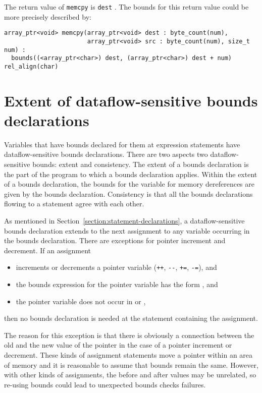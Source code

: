 The return value of \texttt{memcpy} is \texttt{dest} . The bounds for
this return value could be more precisely described by:

\begin{verbatim}
array_ptr<void> memcpy(array_ptr<void> dest : byte_count(num),
                       array_ptr<void> src : byte_count(num), size_t num) :
  bounds((<array_ptr<char>) dest, (array_ptr<char>) dest + num) rel_align(char)
\end{verbatim}

\section{Extent of dataflow-sensitive bounds declarations}
\label{section:extent-of-declarations}

Variables that have bounds declared for them at expression statements
have dataflow-sensitive bounds declarations. There are two aspects two
dataflow-sensitive bounds: extent and consistency. The extent of a
bounds declaration is the part of the program to which a bounds
declaration applies. Within the extent of a bounds declaration, the
bounds for the variable for memory dereferences are given by the bounds
declaration. Consistency is that all the bounds declarations flowing to
a statement agree with each other.

As mentioned in Section~\ref{section:statement-declarations},
a dataflow-sensitive bounds declaration
extends to the next assignment to any variable occurring in the bounds
declaration. There are exceptions for pointer increment and decrement.
If an assignment

\begin{itemize}
\item
  increments or decrements a pointer variable (\texttt{++},
  \texttt{-\/-}, \texttt{+=}, \texttt{-=}), and
\item
  the bounds expression for the pointer variable has the form
  , and
\item
  the pointer variable does not occur in  or ,
\end{itemize}

then no bounds declaration is needed at the statement containing the
assignment.

The reason for this exception is that there is obviously a connection
between the old and the new value of the pointer in the case of a
pointer increment or decrement. These kinds of assignment statements
move a pointer within an area of memory and it is reasonable to assume
that bounds remain the same. However, with other kinds of assignments,
the before and after values may be unrelated, so re-using bounds could
lead to unexpected bounds checks failures.

